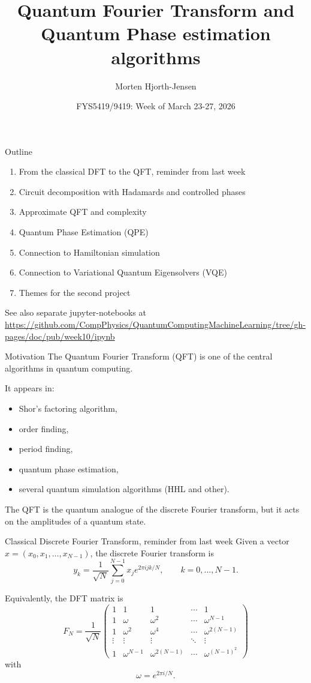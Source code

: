 \documentclass{beamer}
\title{Quantum Fourier Transform and Quantum Phase estimation algorithms}
\author{Morten Hjorth-Jensen}
\date{FYS5419/9419: Week of March 23-27, 2026}
\begin{document}
\frame{\titlepage}

\begin{frame}{Outline}
\begin{enumerate}
\item From the classical DFT to the QFT, reminder from last week
\item Circuit decomposition with Hadamards and controlled phases
\item Approximate QFT and complexity
\item Quantum Phase Estimation (QPE)
\item Connection to Hamiltonian simulation
\item Connection to Variational Quantum Eigensolvers (VQE)
\item Themes for the second project
\end{enumerate}
See also separate jupyter-notebooks at \url{https://github.com/CompPhysics/QuantumComputingMachineLearning/tree/gh-pages/doc/pub/week10/ipynb}
\end{frame}



\begin{frame}{Motivation}
The Quantum Fourier Transform (QFT) is one of the central algorithms in quantum computing. 

It appears in:
\begin{itemize}
\item Shor's factoring algorithm,
\item order finding,
\item period finding,
\item quantum phase estimation,
\item several quantum simulation algorithms (HHL and other).
\end{itemize}

The QFT is the quantum analogue of the discrete Fourier transform, but it acts on the amplitudes of a quantum state.
\end{frame}

\begin{frame}{Classical Discrete Fourier Transform, reminder from last week}
Given a vector \(x=(x_0,x_1,\dots,x_{N-1})\), the discrete Fourier transform is
\[
y_k = \frac{1}{\sqrt N}\sum_{j=0}^{N-1} x_j e^{2\pi i jk/N},
\qquad k=0,\dots,N-1.
\]

Equivalently, the DFT matrix is
\[
F_N = \frac{1}{\sqrt N}
\begin{pmatrix}
1 & 1 & 1 & \cdots & 1 \\
1 & \omega & \omega^2 & \cdots & \omega^{N-1} \\
1 & \omega^2 & \omega^4 & \cdots & \omega^{2(N-1)} \\
\vdots & \vdots & \vdots & \ddots & \vdots \\
1 & \omega^{N-1} & \omega^{2(N-1)} & \cdots & \omega^{(N-1)^2}
\end{pmatrix}
\]
with
\[
\omega = e^{2\pi i/N}.
\]
\end{frame}
\end{document}
